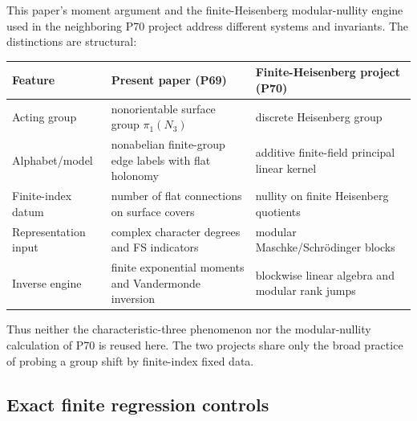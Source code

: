 This paper's moment argument and the finite-Heisenberg modular-nullity engine
used in the neighboring P70 project address different systems and invariants.
The distinctions are structural:

\begin{center}
\begin{tabularx}{\textwidth}{@{}lYY@{}}
\toprule
Feature & Present paper (P69) & Finite-Heisenberg project (P70) \\
\midrule
Acting group & nonorientable surface group $\pi_1(N_3)$ & discrete Heisenberg group \\
Alphabet/model & nonabelian finite-group edge labels with flat holonomy & additive finite-field principal linear kernel \\
Finite-index datum & number of flat connections on surface covers & nullity on finite Heisenberg quotients \\
Representation input & complex character degrees and FS indicators & modular Maschke/Schr\"odinger blocks \\
Inverse engine & finite exponential moments and Vandermonde inversion & blockwise linear algebra and modular rank jumps \\
\bottomrule
\end{tabularx}
\end{center}

Thus neither the characteristic-three phenomenon nor the modular-nullity
calculation of P70 is reused here.  The two projects share only the broad
practice of probing a group shift by finite-index fixed data.

\subsection{Exact finite regression controls}

